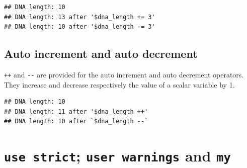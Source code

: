 \documentclass[]{book}
\makeatletter
\newenvironment{Shaded}{\begin{snugshade}}{\end{snugshade}}
\newcommand{\CharTok}[1]{\textcolor[rgb]{0.31,0.60,0.02}{#1}}
\newcommand{\DataTypeTok}[1]{\textcolor[rgb]{0.13,0.29,0.53}{#1}}
\newcommand{\DecValTok}[1]{\textcolor[rgb]{0.00,0.00,0.81}{#1}}
\newcommand{\FunctionTok}[1]{\textcolor[rgb]{0.00,0.00,0.00}{#1}}
\newcommand{\KeywordTok}[1]{\textcolor[rgb]{0.13,0.29,0.53}{\textbf{#1}}}
\newcommand{\NormalTok}[1]{#1}
\newcommand{\StringTok}[1]{\textcolor[rgb]{0.31,0.60,0.02}{#1}}
\newenvironment{kframe}{%
\medskip{}
\setlength{\fboxsep}{.8em}
 \def\at@end@of@kframe{}%
 \ifinner\ifhmode%
  \def\at@end@of@kframe{\end{minipage}}%
  \begin{minipage}{\columnwidth}%
 \fi\fi%
 \def\FrameCommand##1{\hskip\@totalleftmargin \hskip-\fboxsep
 \colorbox{shadecolor}{##1}\hskip-\fboxsep
     \hskip-\linewidth \hskip-\@totalleftmargin \hskip\columnwidth}%
 \MakeFramed {\advance\hsize-\width
   \@totalleftmargin\z@ \linewidth\hsize
   \@setminipage}}%
 {\par\unskip\endMakeFramed%
 \at@end@of@kframe}
\renewenvironment{Shaded}{\begin{kframe}}{\end{kframe}}
\makeatother
\begin{document}
\begin{verbatim}
## DNA length: 10
## DNA length: 13 after '$dna_length += 3'
## DNA length: 10 after '$dna_length -= 3'
\end{verbatim}

\hypertarget{auto-increment-and-auto-decrement}{%
\subsection{Auto increment and auto decrement}\label{auto-increment-and-auto-decrement}}

\texttt{++} and \texttt{-\/-} are provided for the auto increment and auto decrement operators. They increase and decrease respectively the value of a scalar variable by 1.

\begin{Shaded}
\end{Shaded}

\begin{verbatim}
## DNA length: 10
## DNA length: 11 after '$dna_length ++'
## DNA length: 10 after `$dna_length --`
\end{verbatim}

\hypertarget{use-strict-user-warnings-and-my}{%
\section{\texorpdfstring{\texttt{use\ strict}; \texttt{user\ warnings} and \texttt{my}}{use strict; user warnings and my}}\label{use-strict-user-warnings-and-my}}
\end{document}
